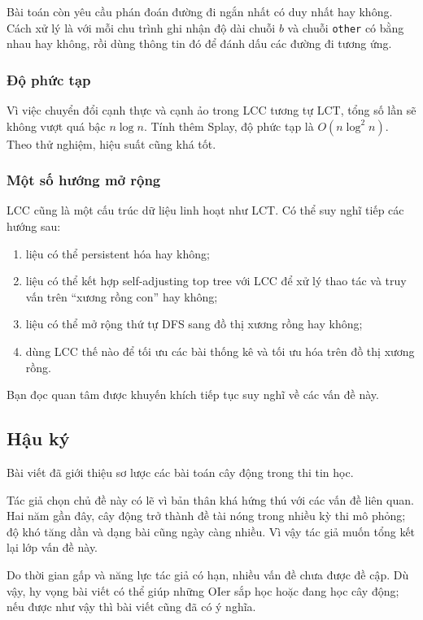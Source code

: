 \documentclass[11pt]{article}
\begin{document}
Bài toán còn yêu cầu phán đoán đường đi ngắn nhất có duy nhất hay không. Cách xử
lý là với mỗi chu trình ghi nhận độ dài chuỗi \(b\) và chuỗi \texttt{other} có
bằng nhau hay không, rồi dùng thông tin đó để đánh dấu các đường đi tương ứng.

\subsubsection{Độ phức tạp}

Vì việc chuyển đổi cạnh thực và cạnh ảo trong LCC tương tự LCT, tổng số lần sẽ
không vượt quá bậc \(n\log n\). Tính thêm Splay, độ phức tạp là
\(O(n\log^2 n)\). Theo thử nghiệm, hiệu suất cũng khá tốt.

\subsubsection{Một số hướng mở rộng}

LCC cũng là một cấu trúc dữ liệu linh hoạt như LCT. Có thể suy nghĩ tiếp các
hướng sau:
\begin{enumerate}
  \item liệu có thể persistent hóa hay không;
  \item liệu có thể kết hợp self-adjusting top tree với LCC để xử lý thao tác và
  truy vấn trên ``xương rồng con'' hay không;
  \item liệu có thể mở rộng thứ tự DFS sang đồ thị xương rồng hay không;
  \item dùng LCC thế nào để tối ưu các bài thống kê và tối ưu hóa trên đồ thị
  xương rồng.
\end{enumerate}

Bạn đọc quan tâm được khuyến khích tiếp tục suy nghĩ về các vấn đề này.

\subsection*{Hậu ký}

Bài viết đã giới thiệu sơ lược các bài toán cây động trong thi tin học.

Tác giả chọn chủ đề này có lẽ vì bản thân khá hứng thú với các vấn đề liên quan.
Hai năm gần đây, cây động trở thành đề tài nóng trong nhiều kỳ thi mô phỏng; độ
khó tăng dần và dạng bài cũng ngày càng nhiều. Vì vậy tác giả muốn tổng kết lại
lớp vấn đề này.

Do thời gian gấp và năng lực tác giả có hạn, nhiều vấn đề chưa được đề cập. Dù
vậy, hy vọng bài viết có thể giúp những OIer sắp học hoặc đang học cây động; nếu
được như vậy thì bài viết cũng đã có ý nghĩa.
\end{document}

